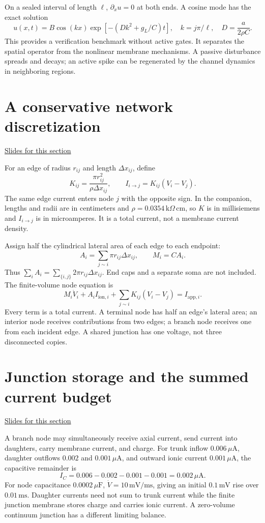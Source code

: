 \documentclass[11pt,letterpaper]{article}
\theoremstyle{definition}\newtheorem{definition}{Definition}\newtheorem{example}{Example}
\numberwithin{equation}{section}
\begin{document}
On a sealed interval of length $\ell$, $\partial_xu=0$ at both ends. A cosine mode has the exact solution
\[
u(x,t)=B\cos(kx)\exp\left[-\left(Dk^2+g_L/C\right)t\right],
\quad k=j\pi/\ell,\quad D=\frac a{2\rho C}.
\]
This provides a verification benchmark without active gates. It separates the spatial operator from the nonlinear membrane mechanisms. A passive disturbance spreads and decays; an active spike can be regenerated by the channel dynamics in neighboring regions.
\section{A conservative network discretization}
\hypertarget{note-a-conservative-network-discretization}{}\label{note:a-conservative-network-discretization}
{\small \href{slides.html\#frame=shared-edge-currents\&step=1}{Slides for this section}}\par
For an edge of radius $r_{ij}$ and length $\Delta x_{ij}$, define
\[
K_{ij}=\frac{\pi r_{ij}^2}{\rho\Delta x_{ij}},\qquad
I_{i\to j}=K_{ij}(V_i-V_j).
\]
The same edge current enters node $j$ with the opposite sign. In the companion, lengths and radii are in centimeters and $\rho=0.0354\,\mathrm{k}\Omega\,\mathrm{cm}$, so $K$ is in millisiemens and $I_{i\to j}$ is in microamperes. It is a total current, not a membrane current density.

Assign half the cylindrical lateral area of each edge to each endpoint:
\[
A_i=\sum_{j\sim i}\pi r_{ij}\Delta x_{ij},\qquad M_i=CA_i.
\]
Thus $\sum_iA_i=\sum_{\{i,j\}}2\pi r_{ij}\Delta x_{ij}$. End caps and a separate soma are not included. The finite-volume node equation is
\[
\boxed{M_i\dot V_i+A_iI_{\mathrm{ion},i}
+\sum_{j\sim i}K_{ij}(V_i-V_j)=I_{\mathrm{app},i}.}
\]
Every term is a total current. A terminal node has half an edge's lateral area; an interior node receives contributions from two edges; a branch node receives one from each incident edge. A shared junction has one voltage, not three disconnected copies.
\section{Junction storage and the summed current budget}
\hypertarget{note-junction-storage-and-the-summed-current-budget}{}\label{note:junction-storage-and-the-summed-current-budget}
{\small \href{slides.html\#frame=a-charging-branch-junction\&step=1}{Slides for this section}}\par
A branch node may simultaneously receive axial current, send current into daughters, carry membrane current, and charge. For trunk inflow $0.006\,\mu\mathrm A$, daughter outflows $0.002$ and $0.001\,\mu\mathrm A$, and outward ionic current $0.001\,\mu\mathrm A$, the capacitive remainder is
\[
I_C=0.006-0.002-0.001-0.001=0.002\,\mu\mathrm A.
\]
For node capacitance $0.0002\,\mu\mathrm F$, $\dot V=10\,\mathrm{mV/ms}$, giving an initial $0.1\,\mathrm{mV}$ rise over $0.01\,\mathrm{ms}$. Daughter currents need not sum to trunk current while the finite junction membrane stores charge and carries ionic current. A zero-volume continuum junction has a different limiting balance.
\end{document}
